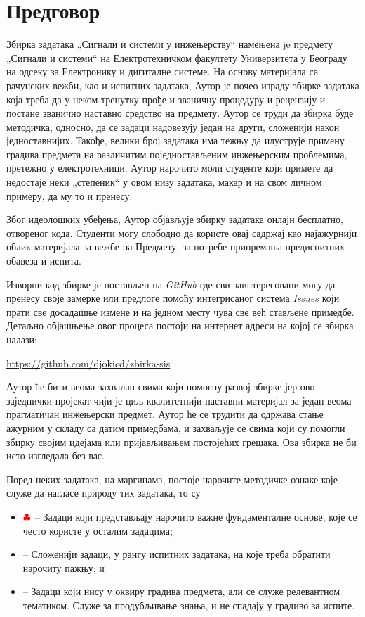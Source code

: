 \section*{Предговор}

Збирка задатака „Сигнали и системи у инжењерству“ намењена je предмету „Сигнали и системи“ на 
Електротехничком факултету Универзитета у Београду на одсеку за Електронику и дигиталне системе. На основу материјала 
са рачунских вежби, као и испитних задатака, Аутор је почео израду збирке задатака која треба да у неком тренутку 
прође и званичну процедуру и рецензију и постане званично наставно средство на предмету. 
Аутор се труди да збирка буде методичка, односно, да се задаци надовезују један на други, сложенији након
једноставнијих. Такође, велики број задатака има тежњу да илуструје примену градива предмета на различитим 
поједностављеним инжењерским проблемима, претежно у електротехници.
Аутор нарочито моли студенте који примете да недостаје неки „степеник“ у овом низу задатака, макар и на свом личном 
примеру, да му то и пренесу. 

Због идеолошких убеђења, Аутор објављује збирку задатака онлајн бесплатно, отвореног кода. 
Студенти могу слободно да користе овај садржај као најажурнији облик материјала за вежбе на 
Предмету, за потребе припремања предиспитних обавеза и испита. 

Изворни код збирке је постављен на \textit{GitHub} где сви заинтересовани могу да пренесу своје замерке или 
предлоге помоћу интегрисаног система \textit{Issues} који прати све досадашње измене и на једном месту чува све 
већ стављене примедбе. Детаљно објашњење овог процеса постоји на интернет адреси на којој се збирка налази:
\begin{center}
    \url{https://github.com/djokicd/zbirka-sis}
\end{center}

Аутор ће бити веома захвалан свима који помогну развој збирке јер ово заједнички
пројекат чији је циљ квалитетнији наставни материјал за један веома прагматичан инжењерски предмет. 
Аутор ће се трудити да одржава стање ажурним у складу са датим примедбама, и захваљује се свима 
који су помогли збирку својим идејама или пријављивањем постојећих грешака. Ова збирка не би исто изгледала без вас. 

Поред неких задатака, на маргинама, постоје нарочите методичке ознаке које служе да нагласе природу тих задатака, то су 
\begin{itemize}
    \item $\color{red}\clubsuit$ -- Задаци који представљају нарочито важне фундаменталне основе, које се често користе у 
    осталим задацима;
    \item \textcolor{red}{\warning} -- Сложенији задаци, у рангу испитних задатака, на које треба обратити нарочиту пажњу; и
    \item \textcolor{red}{\noway} -- Задаци који нису у оквиру градива предмета, али се служе релевантном 
    тематиком. Служе за продубљивање знања, и не спадају у градиво за испите. 
\end{itemize}

